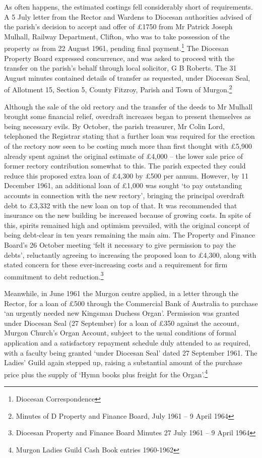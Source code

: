 As often happens, the estimated costings fell considerably short of
requirements. A 5 July letter from the Rector and Wardens to Diocesan
authorities advised of the parish's decision to accept and offer of
£1750 from Mr Patrick Joseph Mulhall, Railway Department, Clifton, who
was to take possession of the property as from 22 August 1961, pending
final payment.\footnote{Diocesan Correspondence} The Diocesan Property
Board expressed concurrence, and was asked to proceed with the transfer
on the parish's behalf through local solicitor, G B Roberts. The 31
August minutes contained details of transfer as requested, under
Diocesan Seal, of Allotment 15, Section 5, County Fitzroy, Parish and
Town of Murgon.\footnote{Minutes of D Property and Finance Board, July
  1961 -- 9 April 1964}

Although the sale of the old rectory and the transfer of the deeds to Mr
Mulhall brought some financial relief, overdraft increases began to
present themselves as being necessary evils. By October, the parish
treasurer, Mr Colin Lord, telephoned the Registrar stating that a
further loan was required for the erection of the rectory now seen to be
costing much more than first thought with £5,900 already spent against
the original estimate of £4,000 -- the lower sale price of former
rectory contribution somewhat to this. The parish expected they could
reduce this proposed extra loan of £4,300 by £500 per annum. However, by
11 December 1961, an additional loan of £1,000 was sought `to pay
outstanding accounts in connection with the new rectory', bringing the
principal overdraft debt to £3,332 with the new loan on top of that. It
was recommended that insurance on the new building be increased because
of growing costs. In spite of this, spirits remained high and optimism
prevailed, with the original concept of being debt-clear in ten years
remaining the main aim. The Property and Finance Board's 26 October
meeting `felt it necessary to give permission to pay the debts',
reluctantly agreeing to increasing the proposed loan to £4,300, along
with stated concern for these ever-increasing costs and a requirement
for firm commitment to debt reduction.\footnote{Diocesan Property and
  Finance Board Minutes 27 July 1961 -- 9 April 1964}

Meanwhile, in June 1961 the Murgon centre applied, in a letter through
the Rector, for a loan of £500 through the Commercial Bank of Australia
to purchase `an urgently needed new Kingsman Duchess Organ'. Permission
was granted under Diocesan Seal (27 September) for a loan of £350
against the account, Murgon Church's Organ Account, subject to the usual
conditions of formal application and a satisfactory repayment schedule
duly attended to as required, with a faculty being granted `under
Diocesan Seal' dated 27 September 1961. The Ladies' Guild again stepped
up, raising a substantial amount of the purchase price plus the supply
of `Hymn books plus freight for the Organ'.\footnote{Murgon Ladies Guild
  Cash Book entries 1960-1962}

